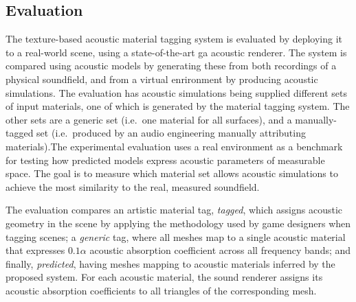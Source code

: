 \subsection{Evaluation}
The texture-based acoustic material tagging system is evaluated by deploying it to a real-world scene, using a state-of-the-art \acrshort{ga} acoustic renderer. The system is compared using acoustic models by generating these from both recordings of a physical soundfield, and from a virtual enrironment by producing acoustic simulations. The evaluation has acoustic simulations being supplied different sets of input materials, one of which is generated by the material tagging system. The other sets are a generic set (i.e.\ one material for all surfaces), and a manually-tagged set (i.e.\ produced by an audio engineering manually attributing materials).The experimental evaluation uses a real environment as a benchmark for testing how predicted models express acoustic parameters of measurable space. The goal is to measure which material set allows acoustic simulations to achieve the most similarity to the real, measured soundfield.\par
The evaluation compares an artistic material tag, \emph{tagged}, which assigns acoustic geometry in the scene by applying the methodology used by game designers when tagging scenes; a \emph{generic} tag, where all meshes map to a single acoustic material that expresses $0.1\alpha$ acoustic absorption coefficient across all frequency bands; and finally, \emph{predicted}, having meshes mapping to acoustic materials inferred by the proposed system. For each acoustic material, the sound renderer assigns its acoustic absorption coefficients to all triangles of the corresponding mesh.\par

